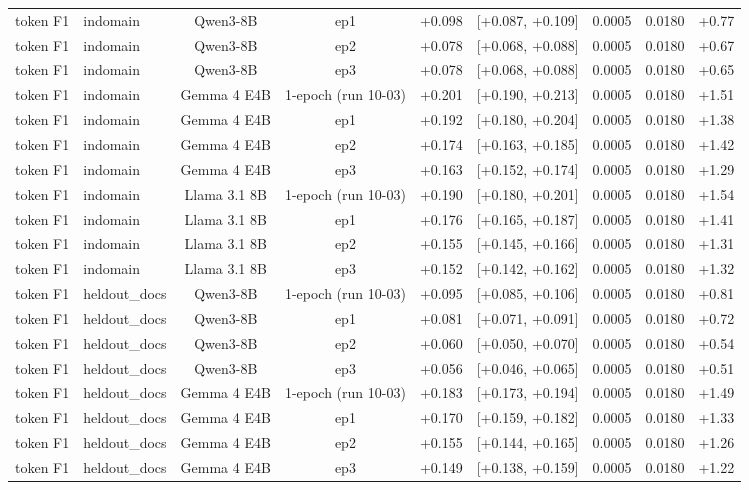 \begin{table}[t]
{\begin{tabular}{llccccccc}
token F1 & indomain & Qwen3-8B & ep1 & +0.098 & [+0.087, +0.109] & 0.0005 & 0.0180 & +0.77 \\
token F1 & indomain & Qwen3-8B & ep2 & +0.078 & [+0.068, +0.088] & 0.0005 & 0.0180 & +0.67 \\
token F1 & indomain & Qwen3-8B & ep3 & +0.078 & [+0.068, +0.088] & 0.0005 & 0.0180 & +0.65 \\
token F1 & indomain & Gemma 4 E4B & 1-epoch (run 10-03) & +0.201 & [+0.190, +0.213] & 0.0005 & 0.0180 & +1.51 \\
token F1 & indomain & Gemma 4 E4B & ep1 & +0.192 & [+0.180, +0.204] & 0.0005 & 0.0180 & +1.38 \\
token F1 & indomain & Gemma 4 E4B & ep2 & +0.174 & [+0.163, +0.185] & 0.0005 & 0.0180 & +1.42 \\
token F1 & indomain & Gemma 4 E4B & ep3 & +0.163 & [+0.152, +0.174] & 0.0005 & 0.0180 & +1.29 \\
token F1 & indomain & Llama 3.1 8B & 1-epoch (run 10-03) & +0.190 & [+0.180, +0.201] & 0.0005 & 0.0180 & +1.54 \\
token F1 & indomain & Llama 3.1 8B & ep1 & +0.176 & [+0.165, +0.187] & 0.0005 & 0.0180 & +1.41 \\
token F1 & indomain & Llama 3.1 8B & ep2 & +0.155 & [+0.145, +0.166] & 0.0005 & 0.0180 & +1.31 \\
token F1 & indomain & Llama 3.1 8B & ep3 & +0.152 & [+0.142, +0.162] & 0.0005 & 0.0180 & +1.32 \\
token F1 & heldout\_docs & Qwen3-8B & 1-epoch (run 10-03) & +0.095 & [+0.085, +0.106] & 0.0005 & 0.0180 & +0.81 \\
token F1 & heldout\_docs & Qwen3-8B & ep1 & +0.081 & [+0.071, +0.091] & 0.0005 & 0.0180 & +0.72 \\
token F1 & heldout\_docs & Qwen3-8B & ep2 & +0.060 & [+0.050, +0.070] & 0.0005 & 0.0180 & +0.54 \\
token F1 & heldout\_docs & Qwen3-8B & ep3 & +0.056 & [+0.046, +0.065] & 0.0005 & 0.0180 & +0.51 \\
token F1 & heldout\_docs & Gemma 4 E4B & 1-epoch (run 10-03) & +0.183 & [+0.173, +0.194] & 0.0005 & 0.0180 & +1.49 \\
token F1 & heldout\_docs & Gemma 4 E4B & ep1 & +0.170 & [+0.159, +0.182] & 0.0005 & 0.0180 & +1.33 \\
token F1 & heldout\_docs & Gemma 4 E4B & ep2 & +0.155 & [+0.144, +0.165] & 0.0005 & 0.0180 & +1.26 \\
token F1 & heldout\_docs & Gemma 4 E4B & ep3 & +0.149 & [+0.138, +0.159] & 0.0005 & 0.0180 & +1.22 \\

\end{tabular}}
\end{table}
